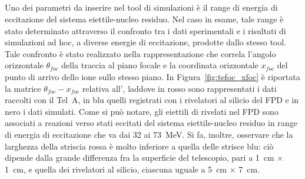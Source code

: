 \subsection{}




Uno dei parametri da inserire nel tool di simulazioni è il range di energia di eccitazione del sistema eiettile-nucleo residuo.
Nel caso in esame, tale range è stato determinato attraverso il confronto tra i dati sperimentali e i risultati di simulazioni ad hoc, a diverse energie di eccitazione, prodotte dallo stesso tool.
Tale confronto è stato realizzato nella rappresentazione che correla l'angolo orizzontale $\theta_{foc}$ della traccia al piano focale e la coordinata orizzontale $x_{foc}$ del punto di arrivo dello ione sullo stesso piano.
In Figura~\ref{fig:tefoc_xfoc} è riportata la matrice $\theta_{foc} - x_{foc}$ relativa all', laddove in rosso sono rappresentati i dati raccolti con il Tel~A, in blu quelli registrati con i rivelatori al silicio del FPD e in nero i dati simulati.
Come si può notare, gli eiettili di  rivelati nel FPD sono associati a reazioni verso stati eccitati del sistema eiettile-nucleo residuo in range di energia di eccitazione che va dai 32 ai 73~MeV.
Si fa, inoltre, osservare che la larghezza della striscia rossa è molto inferiore a quella delle strisce blu: ciò dipende dalla grande differenza fra la superficie del telescopio, pari a  1~cm $\times$ 1~cm, e quella dei rivelatori al silicio, ciascuna uguale a 5~cm $\times$ 7~cm.

